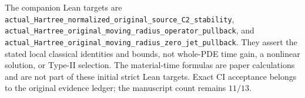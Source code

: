 The companion Lean targets are
\texttt{actual\_Hartree\_normalized\_original\_source\_C2\_stability},
\texttt{actual\_Hartree\_original\_moving\_radius\_operator\_pullback},
and \texttt{actual\_Hartree\_original\_moving\_radius\_zero\_jet\_pullback}.
They assert the stated local classical identities and bounds, not
whole-PDE time gain, a nonlinear solution, or Type-II selection.
The material-time formulas are paper calculations and are not part of
these initial strict Lean targets.  Exact CI acceptance belongs to the
original evidence ledger; the manuscript count remains \(11/13\).
